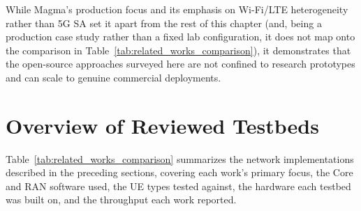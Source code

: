 While Magma's production focus and its emphasis on Wi-Fi/\gls{LTE} heterogeneity rather than 5G \gls{SA} set it apart from the rest of this chapter (and, being a production case study rather than a fixed lab configuration, it does not map onto the comparison in Table~\ref{tab:related_works_comparison}), it demonstrates that the open-source approaches surveyed here are not confined to research prototypes and can scale to genuine commercial deployments.

\section{Overview of Reviewed Testbeds}
\label{sec:related_overview}

Table~\ref{tab:related_works_comparison} summarizes the network implementations described in the preceding sections, covering each work's primary focus, the Core and \gls{RAN} software used, the \gls{UE} types tested against, the hardware each testbed was built on, and the throughput each work reported.

